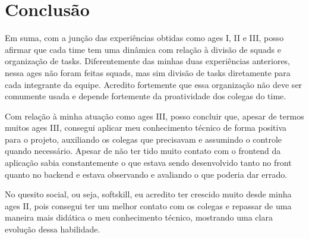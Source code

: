 \section[Conclusão]{Conclusão}

Em suma, com a junção das experiências obtidas como \ac{ages} I, II e III, posso afirmar que cada time tem uma dinâmica com relação à divisão de squads e organização de tasks. Diferentemente das minhas duas experiências anteriores, nessa \ac{ages} não foram feitas squads, mas sim divisão de tasks diretamente para cada integrante da equipe. Acredito fortemente que essa organização não deve ser comumente usada e depende fortemente da proatividade dos colegas do time.

Com relação à minha atuação como \ac{ages} III, posso concluir que, apesar de termos muitos \ac{ages} III, consegui aplicar meu conhecimento técnico de forma positiva para o projeto, auxiliando os colegas que precisavam e assumindo o controle quando necessário. Apesar de não ter tido muito contato com o frontend da aplicação sabia constantemente o que estava sendo desenvolvido tanto no front quanto no backend e estava observando e avaliando o que poderia dar errado.

No quesito social, ou seja, softskill, eu acredito ter crescido muito desde minha \ac{ages} II, pois consegui ter um melhor contato com os colegas e repassar de uma maneira mais didática o meu conhecimento técnico, mostrando uma clara evolução dessa habilidade.